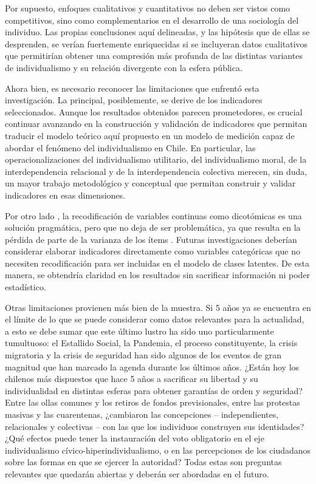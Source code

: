 \documentclass[12pt,twoside]{templates/facsothesis}
\begin{document}
Por supuesto, enfoques cualitativos y cuantitativos no deben ser vistos como competitivos, sino como complementarios en el desarrollo de una sociología del individuo. Las propias conclusiones aquí delineadas, y las hipótesis que de ellas se desprenden, se verían fuertemente enriquecidas si se incluyeran datos cualitativos que permitirían obtener una compresión más profunda de las distintas variantes de individualismo y su relación divergente con la esfera pública.

Ahora bien, es necesario reconocer las limitaciones que enfrentó esta investigación. La principal, posiblemente, se derive de los indicadores seleccionados. Aunque los resultados obtenidos parecen prometedores, es crucial continuar avanzando en la construcción y validación de indicadores que permitan traducir el modelo teórico aquí propuesto en un modelo de medición capaz de abordar el fenómeno del individualismo en Chile. En particular, las operacionalizaciones del individualismo utilitario, del individualismo moral, de la interdependencia relacional y de la interdependencia colectiva merecen, sin duda, un mayor trabajo metodológico y conceptual que permitan construir y validar indicadores en esas dimensiones.

Por otro lado , la recodificación de variables continuas como dicotómicas es una solución pragmática, pero que no deja de ser problemática, ya que resulta en la pérdida de parte de la varianza de los ítems \citep{fernandes2019}. Futuras investigaciones deberían considerar elaborar indicadores directamente como variables categóricas que no necesiten recodificación para ser incluidas en el modelo de clases latentes. De esta manera, se obtendría claridad en los resultados sin sacrificar información ni poder estadístico.

Otras limitaciones provienen más bien de la muestra. Si 5 años ya se encuentra en el límite de lo que se puede considerar como datos relevantes para la actualidad, a esto se debe sumar que este último lustro ha sido uno particularmente tumultuoso: el Estallido Social, la Pandemia, el proceso constituyente, la crisis migratoria y la crisis de seguridad han sido algunos de los eventos de gran magnitud que han marcado la agenda durante los últimos años. ¿Están hoy los chilenos más dispuestos que hace 5 años a sacrificar su libertad y su individualidad en distintas esferas para obtener garantías de orden y seguridad? Entre las ollas comunes y los retiros de fondos previsionales, entre las protestas masivas y las cuarentenas, ¿cambiaron las concepciones -- independientes, relacionales y colectivas -- con las que los individuos construyen sus identidades? ¿Qué efectos puede tener la instauración del voto obligatorio en el eje individualismo cívico-hiperindividualismo, o en las percepciones de los ciudadanos sobre las formas en que se ejercer la autoridad? Todas estas son preguntas relevantes que quedarán abiertas y deberán ser abordadas en el futuro.
\end{document}
